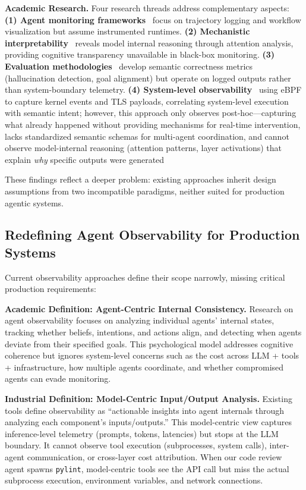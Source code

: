 \documentclass[sigplan,screen,9pt]{acmart}
\begin{document}
\textbf{Academic Research.} Four research threads address complementary aspects: \textbf{(1) Agent monitoring frameworks}~\cite{Rombaut2025Watson,Dong2024AgentOps} focus on trajectory logging and workflow visualization but assume instrumented runtimes. \textbf{(2) Mechanistic interpretability}~\cite{Kim2025AgenticInterp} reveals model internal reasoning through attention analysis, providing cognitive transparency unavailable in black-box monitoring. \textbf{(3) Evaluation methodologies}~\cite{Moshkovich2025Pipeline} develop semantic correctness metrics (hallucination detection, goal alignment) but operate on logged outputs rather than system-boundary telemetry. \textbf{(4) System-level observability}~\cite{zheng2025agentsight} using eBPF to capture kernel events and TLS payloads, correlating system-level execution with semantic intent; however, this approach only observes post-hoc---capturing what already happened without providing mechanisms for real-time intervention, lacks standardized semantic schemas for multi-agent coordination, and cannot observe model-internal reasoning (attention patterns, layer activations) that explain \emph{why} specific outputs were generated

These findings reflect a deeper problem: existing approaches inherit design assumptions from two incompatible paradigms, neither suited for production agentic systems.

\subsection{Redefining Agent Observability for Production Systems}

Current observability approaches define their scope narrowly, missing critical production requirements:

\textbf{Academic Definition: Agent-Centric Internal Consistency.} Research on agent observability focuses on analyzing individual agents' internal states, tracking whether beliefs, intentions, and actions align, and detecting when agents deviate from their specified goals. This psychological model addresses cognitive coherence but ignores system-level concerns such as the cost across LLM + tools + infrastructure, how multiple agents coordinate, and whether compromised agents can evade monitoring.

\textbf{Industrial Definition: Model-Centric Input/Output Analysis.} Existing tools define observability as ``actionable insights into agent internals through analyzing each component's inputs/outputs.'' This model-centric view captures inference-level telemetry (prompts, tokens, latencies) but stops at the LLM boundary. It cannot observe tool execution (subprocesses, system calls), inter-agent communication, or cross-layer cost attribution. When our code review agent spawns \texttt{pylint}, model-centric tools see the API call but miss the actual subprocess execution, environment variables, and network connections.
\end{document}

